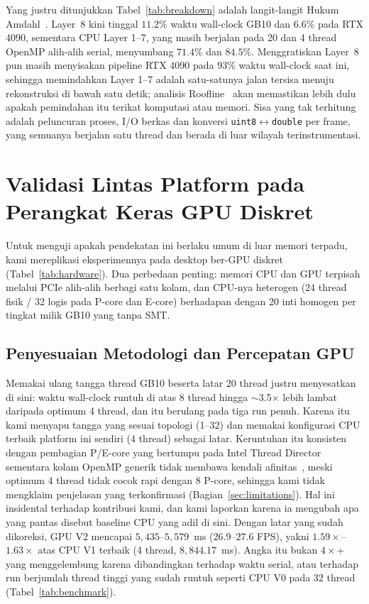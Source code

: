 \documentclass[conference]{IEEEtran}
\begin{document}
Yang justru ditunjukkan Tabel~\ref{tab:breakdown} adalah langit-langit Hukum Amdahl~\cite{amdahl1967}. Layer~8 kini tinggal $11.2\%$ waktu wall-clock GB10 dan $6.6\%$ pada RTX 4090, sementara CPU Layer 1--7, yang masih berjalan pada 20 dan 4 thread OpenMP alih-alih serial, menyumbang $71.4\%$ dan $84.5\%$. Menggratiskan Layer~8 pun masih menyisakan pipeline RTX 4090 pada $93\%$ waktu wall-clock saat ini, sehingga memindahkan Layer 1--7 adalah satu-satunya jalan tersisa menuju rekonstruksi di bawah satu detik; analisis Roofline~\cite{williams2009roofline} akan memastikan lebih dulu apakah pemindahan itu terikat komputasi atau memori. Sisa yang tak terhitung adalah peluncuran proses, I/O berkas dan konversi \texttt{uint8}$\leftrightarrow$\texttt{double} per frame, yang semuanya berjalan satu thread dan berada di luar wilayah terinstrumentasi.

\section{Validasi Lintas Platform pada Perangkat Keras GPU Diskret}
\label{sec:rtx4090}

Untuk menguji apakah pendekatan ini berlaku umum di luar memori terpadu, kami mereplikasi eksperimennya pada desktop ber-GPU diskret (Tabel~\ref{tab:hardware}). Dua perbedaan penting: memori CPU dan GPU terpisah melalui PCIe alih-alih berbagi satu kolam, dan CPU-nya heterogen (24 thread fisik / 32 logis pada P-core dan E-core) berhadapan dengan 20 inti homogen per tingkat milik GB10 yang tanpa SMT.

\subsection{Penyesuaian Metodologi dan Percepatan GPU}
Memakai ulang tangga thread GB10 beserta latar 20 thread justru menyesatkan di sini: waktu wall-clock runtuh di atas 8 thread hingga $\sim$3.5$\times$ lebih lambat daripada optimum 4 thread, dan itu berulang pada tiga run penuh. Karena itu kami menyapu tangga yang sesuai topologi (1--32) dan memakai konfigurasi CPU terbaik platform ini sendiri (4 thread) sebagai latar. Keruntuhan itu konsisten dengan pembagian P/E-core yang bertumpu pada Intel Thread Director sementara kolam OpenMP generik tidak membawa kendali afinitas~\cite{eichenberger2012ompaffinity}, meski optimum 4 thread tidak cocok rapi dengan 8 P-core, sehingga kami tidak mengklaim penjelasan yang terkonfirmasi (Bagian~\ref{sec:limitations}). Hal ini insidental terhadap kontribusi kami, dan kami laporkan karena ia mengubah apa yang pantas disebut baseline CPU yang adil di sini. Dengan latar yang sudah dikoreksi, GPU V2 mencapai $5{,}435$--$5{,}579$~ms ($26.9$--$27.6$ FPS), yakni $1.59\times$--$1.63\times$ atas CPU V1 terbaik (4 thread, $8{,}844.17$~ms). Angka itu bukan $4\times$+ yang menggelembung karena dibandingkan terhadap waktu serial, atau terhadap run berjumlah thread tinggi yang sudah runtuh seperti CPU V0 pada 32 thread (Tabel~\ref{tab:benchmark}).
\end{document}
